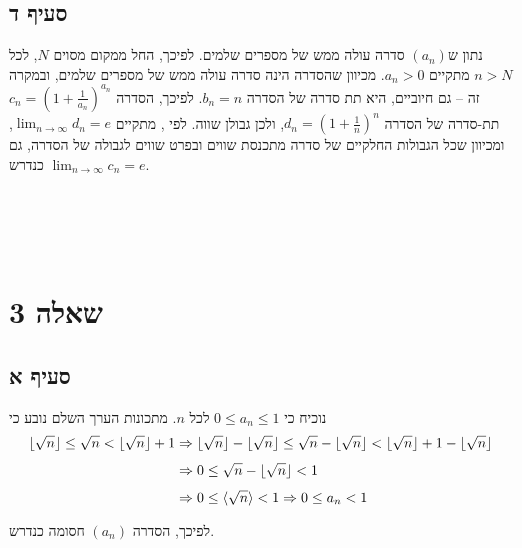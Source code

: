 \documentclass[11pt, oneside]{article}
\newcommand{\qed}{\R{$\blacksquare$}}
\newcommand{\br}{\\\\\\\\\\\\\\}
\newcommand{\logr}[1]{\underset{\text{#1}}{\Rightarrow}}
\renewcommand{\d}[3]{\R{דוגמה #2.#1#3}}
\DeclarePairedDelimiter\floor{\lfloor}{\rfloor}
\DeclarePairedDelimiter\quo{\langle}{\rangle}
\begin{document}
\subsection*{סעיף ד}
נתון ש$(a_{n})$ סדרה עולה ממש של מספרים שלמים. לפיכך, החל ממקום מסוים $N$, לכל $n > N$ מתקיים $a_{n} > 0$. מכיוון שהסדרה הינה סדרה עולה ממש של מספרים שלמים, ובמקרה זה -- גם חיוביים, היא תת סדרה של הסדרה $b_{n} = n$. לפיכך, הסדרה $c_{n} = (1 + \frac{1}{a_{n}})^{a_{n}}$ תת-סדרה של הסדרה $d_{n} = (1 + \frac{1}{n})^{n}$, ולכן גבולן שווה. לפי \d{3}{5}{}, מתקיים $\lim_{n \to \infty} d_{n} = e$, ומכיוון שכל הגבולות החלקיים של סדרה מתכנסת שווים ובפרט שווים לגבולה של הסדרה, גם $\lim_{n \to \infty} c_{n} = e$ כנדרש.
\\\\\\\\\\\qed

\clearpage
\section*{שאלה 3}
\subsection*{סעיף א}
נוכיח כי $0 \le a_{n} \le 1$ לכל $n$. מתכונות הערך השלם נובע כי
\begin{align*}
\floor{\sqrt{n}} \le \sqrt{n} < \floor{\sqrt{n}} + 1
& \logr{} \floor{\sqrt{n}} - \floor{\sqrt{n}} \le \sqrt{n} - \floor{\sqrt{n}} < \floor{\sqrt{n}} + 1 - \floor{\sqrt{n}}\\
& \logr{} 0 \le \sqrt{n} - \floor{\sqrt{n}} < 1\\
& \logr{} 0 \le \quo{\sqrt{n}} < 1 \logr{} 0 \le a_{n} < 1
\end{align*}
לפיכך, הסדרה $(a_{n})$ חסומה כנדרש.
\br\qed
\end{document}
